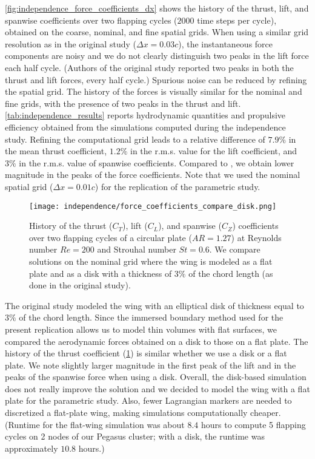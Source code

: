 \cref{fig:independence_force_coefficients_dx} shows the history of the thrust, lift, and spanwise coefficients over two flapping cycles ($2000$ time steps per cycle), obtained on the coarse, nominal, and fine spatial grids.
When using a similar grid resolution as in the original study ($\Delta x = 0.03c$), the instantaneous force components are noisy and we do not clearly distinguish two peaks in the lift force each half cycle.
(Authors of the original study reported two peaks in both the thrust and lift forces, every half cycle.)
Spurious noise can be reduced by refining the spatial grid.
The history of the forces is visually similar for the nominal and fine grids, with the presence of two peaks in the thrust and lift.
\cref{tab:independence_results} reports hydrodynamic quantities and propulsive efficiency obtained from the simulations computed during the independence study.
Refining the computational grid leads to a relative difference of $7.9\%$ in the mean thrust coefficient, $1.2\%$ in the r.m.s. value for the lift coefficient, and $3\%$ in the r.m.s. value of spanwise coefficients.
Compared to \citet{li_dong_2016}, we obtain lower magnitude in the peaks of the force coefficients.
Note that we used the nominal spatial grid ($\Delta x = 0.01c$) for the replication of the parametric study.

\begin{figure}[!h]
  \centering
  \texttt{[image: independence/force\_coefficients\_compare\_disk.png]}
  \caption{History of the thrust ($C_T$), lift ($C_L$), and spanwise ($C_Z$) coefficients over two flapping cycles of a circular plate ($AR = 1.27$) at Reynolds number $Re = 200$ and Strouhal number $St = 0.6$. We compare solutions on the nominal grid where the wing is modeled as a flat plate and as a disk with a thickness of $3\%$ of the chord length (as done in the original study\supercite{li_dong_2016}).}
  \label{fig:independence_force_coefficients_disk}
\end{figure}

The original study modeled the wing with an elliptical disk of thickness equal to $3\%$ of the chord length.
Since the immersed boundary method used for the present replication allows us to model thin volumes with flat surfaces,
we compared the aerodynamic forces obtained on a disk to those on a flat plate.
The history of the thrust coefficient (\cref{fig:independence_force_coefficients_disk}) is similar whether we use a disk or a flat plate.
We note slightly larger magnitude in the first peak of the lift and in the peaks of the spanwise force when using a disk.
Overall, the disk-based simulation does not really improve the solution and we decided to model the wing with a flat plate for the parametric study.
Also, fewer Lagrangian markers are needed to discretized a flat-plate wing, making simulations computationally cheaper.
(Runtime for the flat-wing simulation was about $8.4$ hours to compute 5 flapping cycles on 2 nodes of our Pegasus cluster; with a disk, the runtime was approximately $10.8$ hours.)


